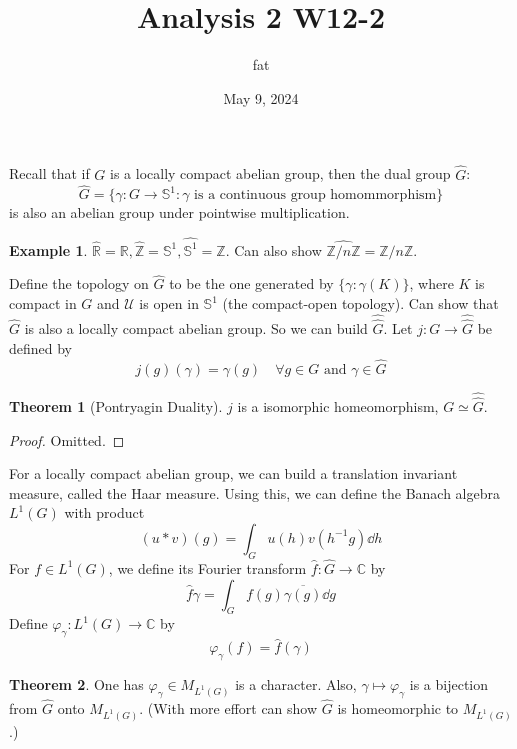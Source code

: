 \documentclass{article}
\title{Analysis 2 W12-2}
\author{fat}
\date{May 9, 2024}
\theoremstyle{definition}
\newtheorem{thm}{Theorem}
\newtheorem{ex}{Example}
\newcommand{\CC}{\mathbb C}
\newcommand{\RR}{\mathbb R}
\renewcommand{\SS}{\mathbb S}
\newcommand{\U}{\mathcal U}
\newcommand{\ZZ}{\mathbb Z}
\begin{document}
\maketitle
\thispagestyle{fancy}
\renewcommand{\footrulewidth}{0.4pt}
\cfoot{\thepage}
\renewcommand{\headrulewidth}{0.4pt}

Recall that if $G$ is a locally compact abelian group, then the dual group $\widehat{G}$:
\[
	\widehat{G} = \{\gamma: G \to \SS^1: \gamma \text{ is a continuous group homommorphism}\}
\]
is also an abelian group under pointwise multiplication.

\begin{ex}
	$\widehat{\RR} = \RR, \widehat{\ZZ} = \SS^1, \widehat{\SS^1} = \ZZ$.
	Can also show $\widehat{\ZZ/n \ZZ} = \ZZ/n \ZZ$.
\end{ex}

Define the topology on $\widehat{G}$ to be the one generated by $\{\gamma: \gamma(K) \}$, where $K$ is compact in $G$ and $\U$ is open in $\SS^1$ (the compact-open topology).
Can show that $\widehat{G}$ is also a locally compact abelian group.
So we can build $\widehat{\widehat{G}}$.
Let $j: G \to \widehat{\widehat{G}}$ be defined by
\[
	j(g)(\gamma) = \gamma(g) \quad \forall g \in G \text{ and } \gamma \in \widehat{G}
\]

\begin{thm}[Pontryagin Duality]
	$j$ is a isomorphic homeomorphism, $G \simeq \widehat{\widehat{G}}$.
\end{thm}

\begin{proof}
	Omitted.
\end{proof}

For a locally compact abelian group, we can build a translation invariant measure, called the Haar measure.
Using this, we can define the Banach algebra $L^1(G)$ with product 
\[
	(u * v)(g) = \int_G u(h) v(h^{-1}g) \dd{h}
\]
For $f \in L^1(G)$, we define its Fourier transform $\widehat{f}: \widehat{G} \to \CC$ by 
\[
	\widehat{f}{\gamma} = \int_G f(g) \overline{\gamma(g)} \dd{g}
\]
Define $\varphi_\gamma: L^1(G) \to \CC$ by 
\[
	\varphi_\gamma(f) = \widehat{f}(\gamma)
\]

\begin{thm}
	One has $\varphi_\gamma \in M_{L^1(G)}$ is a character.
	Also, $\gamma \mapsto \varphi_\gamma$ is a bijection from $\widehat{G}$ onto $M_{L^1(G)}$.
	(With more effort can show $\widehat{G}$ is homeomorphic to $M_{L^1(G)}$.)
\end{thm}
\end{document}
